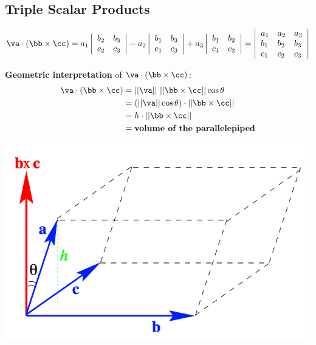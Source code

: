 \begin{spacing}{1.3}
    \subsection{Triple Scalar Products}
    $$\va\cdot (\bb\times \cc)=a_{1}\left|
    \begin{array}
        {ll}b_{2} & b_{3} \\ 
        c_{2} & c_{3}
    \end{array}\right|-
    a_{2}\left|
    \begin{array}{ll}
        b_{1} & b_{3} \\ 
        c_{1} & c_{3}
    \end{array}\right|+
    a_{3}\left|
    \begin{array}{ll}
        b_{1} & b_{2} \\ 
        c_{1} & c_{2}
    \end{array}\right|=
    \left|
    \begin{array}{lll}
        a_{1} & a_{2} & a_{3} \\ 
        b_{1} & b_{2} & b_{3} \\ 
        c_{1} & c_{2} & c_{3}
    \end{array}\right|$$
    
    {\bf Geometric interpretation} of $\va\cdot (\bb\times \cc)$: 
    \begin{align*}
        \va\cdot (\bb\times \cc) &= ||\va||\ ||\bb\times \cc||\cos\theta \\
        &= \left(||\va||\cos\theta\right)\cdot ||\bb\times \cc||\\
        &= h\cdot ||\bb\times \cc||\\
        &= \textbf{volume of the parallelepiped}
    \end{align*}
    \begin{center}
        \includegraphics[scale=0.5]{images/Ch10-triple-scalar-prod.png}
    \end{center}


\end{spacing}

